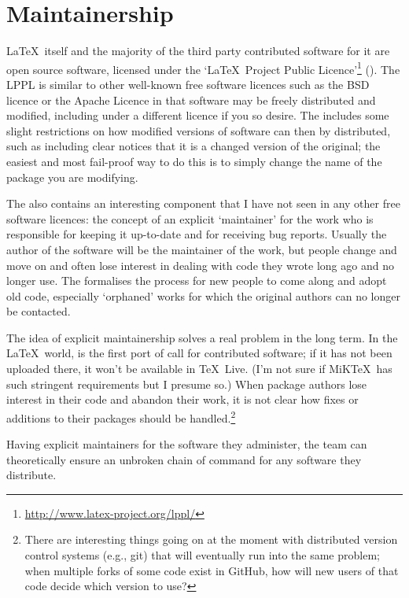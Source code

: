 \documentclass{ltugboat}
\begin{document}
\section{Maintainership}

\LaTeX\ itself and the majority of the third party contributed software for it are open source software, licensed under the `\LaTeX\ Project Public Licence'\footnote{\url{http://www.latex-project.org/lppl/}} (). The LPPL is similar to other well-known free software licences such as the BSD licence or the Apache Licence in that software may be freely distributed and modified, including under a different licence if you so desire. The  includes some slight restrictions on how modified versions of software can then by distributed, such as including clear notices that it is a changed version of the original; the easiest and most fail-proof way to do this is to simply change the name of the package you are modifying.

The  also contains an interesting component that I have not seen in any other free software licences: the concept of an explicit `maintainer' for the work who is responsible for keeping it up-to-date and for receiving bug reports. Usually the author of the software will be the maintainer of the work, but people change and move on and often lose interest in dealing with code they wrote long ago and no longer use. The  formalises the process for new people to come along and adopt old code, especially `orphaned' works for which the original authors can no longer be contacted.

The idea of explicit maintainership solves a real problem in the long term. In the \LaTeX\ world,  is the first port of call for contributed software; if it has not been uploaded there, it won't be available in \TeX\ Live. (I'm not sure if MiK\TeX\ has such stringent requirements but I presume so.) When package authors lose interest in their code and abandon their work, it is not clear how fixes or additions to their packages should be handled.\footnote{There are interesting things going on at the moment with distributed version control systems (e.g., git) that will eventually run into the same problem; when multiple forks of some code exist in GitHub, how will new users of that code decide which version to use?}

Having explicit maintainers for the software they administer, the  team can theoretically ensure an unbroken chain of command for any software they distribute.
\end{document}
